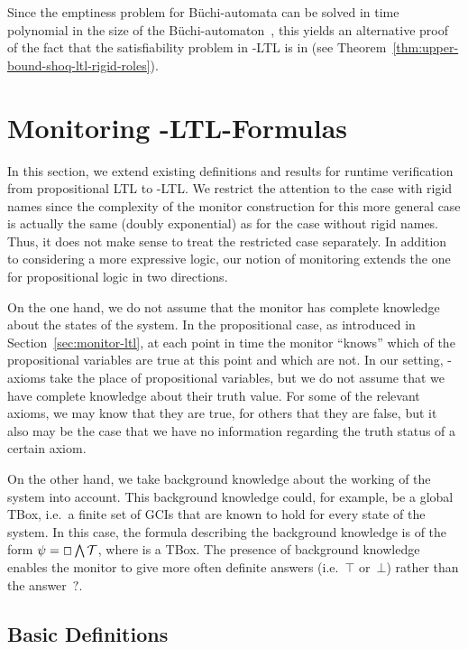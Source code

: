 Since the emptiness problem for Büchi-automata can be solved in time polynomial
in the size of the Büchi-automaton~\cite{VaWo-IC94}, this yields an alternative
proof of the fact that the satisfiability problem in \SHOQ-LTL is in \TwoExpTime
(see Theorem~\ref{thm:upper-bound-shoq-ltl-rigid-roles}).


\section{Monitoring \texorpdfstring{\SHOQ-LTL}{SHOQ-LTL}-Formulas}\label{sec:monitor}

In this section, we extend existing definitions and results for runtime
verification from propositional LTL to \SHOQ-LTL\@.  We restrict the attention
to the case with rigid names since the complexity of the monitor construction
for this more general case is actually the same (doubly exponential) as for the
case without rigid names.  Thus, it does not make sense to treat the restricted
case separately.  In addition to considering a more expressive logic, our notion
of monitoring extends the one for propositional logic in two directions.

On the one hand, we do not assume that the monitor has complete knowledge about
the states of the system.  In the propositional case, as introduced in
Section~\ref{sec:monitor-ltl}, at each point in time the monitor \enquote{knows}
which of the propositional variables are true at this point and which are not.
In our setting, \SHOQ-axioms take the place of propositional variables, but we
do not assume that we have complete knowledge about their truth value.  For some
of the relevant axioms, we may know that they are true, for others that they are
false, but it also may be the case that we have no information regarding the
truth status of a certain axiom.

On the other hand, we take background knowledge about the working of the system
into account.  This background knowledge could, for example, be a global TBox,
i.e.~a finite set of GCIs that are known to hold for every state of the system.
In this case, the formula describing the background knowledge is of the form
$\psi=\Box\bigwedge\mathcal{T}$, where \Tmc is a TBox.  The presence of background
knowledge enables the monitor to give more often definite answers (i.e.~$\top$
or~$\bot$) rather than the answer~${?}$.


\subsection{Basic Definitions}

